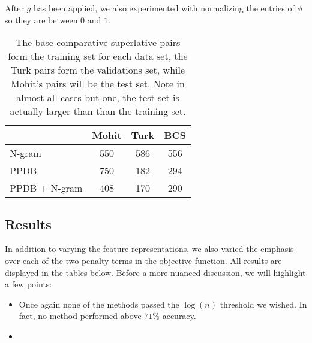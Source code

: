 After $g$ has been applied, we also experimented with normalizing the entries of $\phi$ so they are between $0$ and $1$. 


\begin{table}
\small
\centering
\begin{tabular}{|l|c|c|c|}
	\hline 
	& \multicolumn{1}{c|}{Mohit} 
	& \multicolumn{1}{c|}{Turk} 
	& \multicolumn{1}{c|}{BCS} \\
	\hline 
	N-gram          & 550 & 586 & 556 \\
	PPDB            & 750 & 182 & 294 \\
	PPDB + N-gram   & 408 & 170 & 290 \\
	\hline
\end{tabular}
\caption{\label{font-table} The base-comparative-superlative pairs form the training set for each data set, the Turk pairs form the validations set, while Mohit's pairs will be the test set. Note in almost all cases but one, the test set is actually larger than than the training set. }
\end{table}


\subsection{Results}

In addition to varying the feature representations, we also varied the emphasis over each of the two penalty terms in the objective function. All results are displayed in the tables below. Before a more nuanced discussion, we will highlight a few points:

\begin{itemize}
	\item Once again none of the methods passed the $\log(n)$ threshold we wished. In fact, no method performed above $71\%$ accuracy.
	\item 
\end{itemize}


